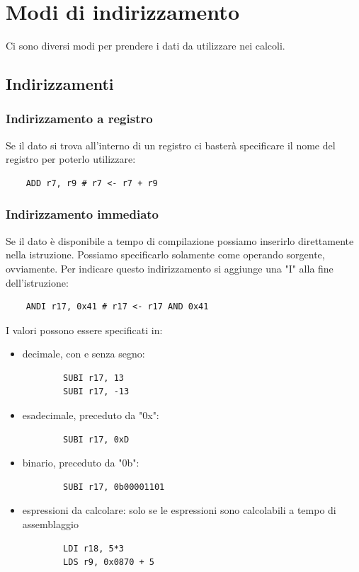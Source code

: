\section{Modi di indirizzamento}
Ci sono diversi modi per prendere i dati da utilizzare nei calcoli.

\subsection{Indirizzamenti}

\subsubsection{Indirizzamento a registro}
Se il dato si trova all'interno di un registro ci basterà specificare il nome del registro per poterlo utilizzare:
\begin{verbatim}
    ADD r7, r9 # r7 <- r7 + r9
\end{verbatim}

\subsubsection{Indirizzamento immediato}
Se il dato è disponibile a tempo di compilazione possiamo inserirlo direttamente nella istruzione.
Possiamo specificarlo solamente come operando sorgente, ovviamente.
Per indicare questo indirizzamento si aggiunge una "I" alla fine dell'istruzione:
\begin{verbatim}
    ANDI r17, 0x41 # r17 <- r17 AND 0x41
\end{verbatim}

I valori possono essere specificati in:
\begin{itemize}
    \item decimale, con e senza segno:
    \begin{verbatim}
        SUBI r17, 13
        SUBI r17, -13
    \end{verbatim}
    
    \item esadecimale, preceduto da "0x":
    \begin{verbatim}
        SUBI r17, 0xD
    \end{verbatim}
    
    \item binario, preceduto da "0b":
    \begin{verbatim}
        SUBI r17, 0b00001101
    \end{verbatim}
    
    \item espressioni da calcolare: solo se le espressioni sono calcolabili a tempo di assemblaggio
    \begin{verbatim}
        LDI r18, 5*3
        LDS r9, 0x0870 + 5
    \end{verbatim}
\end{itemize}


